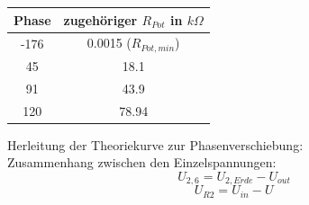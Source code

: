 \documentclass[compress,11pt]{beamer}
\begin{document}
\begin{frame}
\begin{tabular}{|c|c|}
\hline
Phase & zugehöriger $R_{Pot}$ in $k \Omega$  \\
\hline
    -176 & 0.0015 ($R_{Pot,min}$) \\
    45 & 18.1 \\
    91 & 43.9 \\
	120 & 78.94 \\
	
	
\hline
\end{tabular}

\end{frame}
\begin{frame}
Herleitung der Theoriekurve zur Phasenverschiebung:\\
Zusammenhang zwischen den Einzelspannungen:
\begin{equation}
U_{2,6} = U_{2,Erde} -  U_{out}
\end{equation}
\begin{equation}
U_{R2} = U_{in} - U_{}
\end{equation}
\end{frame}
\end{document}
